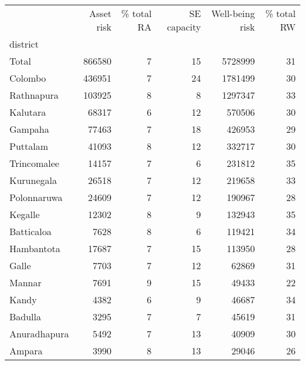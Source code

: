 \begin{tabular}{lrrrrr}
\toprule
{} &  Asset risk &  \% total RA &  SE capacity &  Well-being risk &  \% total RW \\
district     &             &             &              &                  &             \\
\midrule
Total        &      866580 &           7 &           15 &          5728999 &          31 \\
Colombo      &      436951 &           7 &           24 &          1781499 &          30 \\
Rathnapura   &      103925 &           8 &            8 &          1297347 &          33 \\
Kalutara     &       68317 &           6 &           12 &           570506 &          30 \\
Gampaha      &       77463 &           7 &           18 &           426953 &          29 \\
Puttalam     &       41093 &           8 &           12 &           332717 &          30 \\
Trincomalee  &       14157 &           7 &            6 &           231812 &          35 \\
Kurunegala   &       26518 &           7 &           12 &           219658 &          33 \\
Polonnaruwa  &       24609 &           7 &           12 &           190967 &          28 \\
Kegalle      &       12302 &           8 &            9 &           132943 &          35 \\
Batticaloa   &        7628 &           8 &            6 &           119421 &          34 \\
Hambantota   &       17687 &           7 &           15 &           113950 &          28 \\
Galle        &        7703 &           7 &           12 &            62869 &          31 \\
Mannar       &        7691 &           9 &           15 &            49433 &          22 \\
Kandy        &        4382 &           6 &            9 &            46687 &          34 \\
Badulla      &        3295 &           7 &            7 &            45619 &          31 \\
Anuradhapura &        5492 &           7 &           13 &            40909 &          30 \\
Ampara       &        3990 &           8 &           13 &            29046 &          26 \\

\end{tabular}
